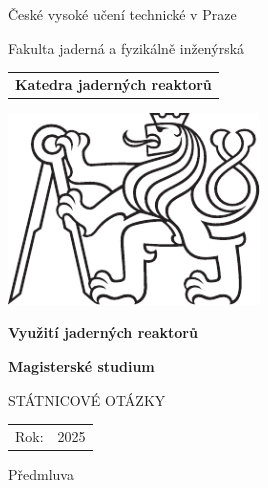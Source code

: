 \documentclass[a4paper, 11pt]{article}
\newcommand{\logoCVUT}{\includegraphics[width = 0.5\textwidth]{img/symbol_cvut_konturova_verze_cb.pdf}}
\begin{document}
\thispagestyle{empty}

\begin{center}
	{\LARGE
		České vysoké učení technické v Praze \par
		Fakulta jaderná a fyzikálně inženýrská
	}
    \vspace{10mm}

    \begin{tabular}{c}
		\textbf{Katedra jaderných reaktorů} \\[3pt]
    \end{tabular}

   \vspace{10mm} \logoCVUT \vspace{15mm}

   {\huge \textbf{Využití jaderných reaktorů}\par}
   \vspace{5mm}
   {\huge \textbf{Magisterské studium}\par}

   \vspace{15mm}
   {\Large \MakeUppercase{Státnicové otázky}}

   \vfill
   {\large
    \begin{tabular}{ll}
    Rok: & 2025
    \end{tabular}
   }
\end{center}

\newpage
\thispagestyle{empty}

\vfill

\vspace{1em}
Předmluva

\vspace{2em}

\clearpage{\pagestyle{empty}}



\newpage
\parskip=0pt
\begin{small}
\tableofcontents
\end{small}
\parskip=7pt
\newpage
















\end{document}
